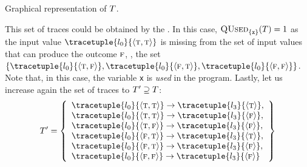 \begin{example}
\begin{marginfigure}
\caption{Graphical representation of $T$.}
\end{marginfigure}
This set of traces could be obtained by the .
In this case, $\textup{\textsc{QUsed}}_{\{\texttt{x} \}}(T)=1$ as the input value $\tracetuple{\locinit}{\langle \true, \true\rangle}$ is missing from the set of input values that can produce the outcome $\textsc{f}$, \cf, the set $\{ \tracetuple{\locinit}{\langle \true, \false\rangle}, \tracetuple{\locinit}{\langle \false, \true\rangle}, \tracetuple{\locinit}{\langle \false, \false\rangle} \}$.
Note that, in this case, the variable \texttt{x} is \emph{used} in the program.
Lastly, let us increase again the set of traces to $T' \supseteq T$:
\begin{align*}
  \defsetoftraces'
  =
  \left\{
    \begin{array}{l}
      \tracetuple{\locinit}{\langle \true, \true\rangle}\rightarrow\tracetuple{\loc{3}}{\langle \true\rangle}, \\
      \tracetuple{\locinit}{\langle \true, \true\rangle}\rightarrow\tracetuple{\loc{3}}{\langle \false\rangle}, \\
      \tracetuple{\locinit}{\langle \true, \false\rangle}\rightarrow\tracetuple{\loc{3}}{\langle \false\rangle}, \\
      \tracetuple{\locinit}{\langle \false, \true\rangle}\rightarrow\tracetuple{\loc{3}}{\langle \true\rangle}, \\
      \tracetuple{\locinit}{\langle \false, \true\rangle}\rightarrow\tracetuple{\loc{3}}{\langle \false\rangle}, \\
      \tracetuple{\locinit}{\langle \false, \false\rangle}\rightarrow\tracetuple{\loc{3}}{\langle \false\rangle}
    \end{array}
    \right\}
\end{align*}
\begin{marginfigure}[*-6]
\end{marginfigure}
\end{example}
